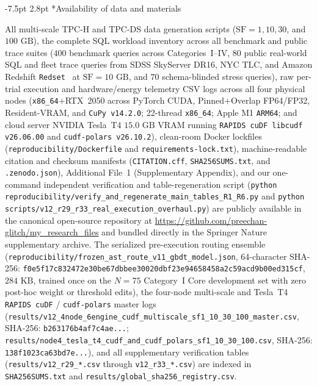 \documentclass[10pt,a4paper]{article}
\makeatletter
\renewcommand\subsection{\@startsection{subsection}{2}{\z@}%
  {-7.5pt \@plus -2pt \@minus -1pt}%
  {2.8pt \@plus 1pt}%
  {\normalfont\normalsize\bfseries}}
\makeatother
\begin{document}
\subsection*{Availability of data and materials}
{\scriptsize All multi-scale TPC-H and TPC-DS data generation scripts ($\text{SF}=1, 10, 30$, and $100\text{ GB}$), the complete SQL workload inventory across all benchmark and public trace suites ($400$ benchmark queries across Categories~I--IV, $80$ public real-world SQL and fleet trace queries from SDSS SkyServer DR16, NYC TLC, and Amazon Redshift \texttt{Redset}~\cite{vanrenen2024redset} at $\text{SF}=10\text{ GB}$, and $70$ schema-blinded stress queries), raw per-trial execution and hardware/energy telemetry CSV logs across all four physical nodes (\texttt{x86\_64}+RTX~2050 across PyTorch CUDA, Pinned+Overlap FP64/FP32, Resident-VRAM, and \texttt{CuPy v14.2.0}; 22-thread \texttt{x86\_64}; Apple M1 \texttt{ARM64}; and cloud server NVIDIA Tesla~T4 $15.0\text{ GB}$ VRAM running \texttt{RAPIDS cuDF libcudf v26.06.00} and \texttt{cudf-polars v26.10.2}), clean-room Docker lockfiles (\texttt{reproducibility/\allowbreak{}Dockerfile} and \texttt{requirements-\allowbreak{}lock.txt}), machine-readable citation and checksum manifests (\texttt{CITATION.cff}, \texttt{SHA256SUMS.txt}, and \texttt{.zenodo.json}), Additional File~1 (Supplementary Appendix), and our one-command independent verification and table-regeneration script (\texttt{python reproducibility/verify\_\allowbreak{}and\_\allowbreak{}regenerate\_\allowbreak{}main\_\allowbreak{}tables\_\allowbreak{}R1\_\allowbreak{}R6.py} and \texttt{python scripts/v12\_\allowbreak{}r29\_\allowbreak{}r33\_\allowbreak{}real\_\allowbreak{}execution\_\allowbreak{}overhaul.py}) are publicly available in the canonical open-source repository at \url{https://github.com/preechan-glitch/my_research_files} and bundled directly in the Springer Nature supplementary archive. The serialized pre-execution routing ensemble (\texttt{reproducibility/\allowbreak{}frozen\_\allowbreak{}ast\_\allowbreak{}route\_\allowbreak{}v11\_\allowbreak{}gbdt\_\allowbreak{}model.json}, 64-character SHA-256: \texttt{f0e5f17c832472e30be67dbbee30020dbf23e94658458a2c59acd9b00ed315cf}, $284\text{ KB}$, trained once on the $N=75$ Category~I Core development set with zero post-hoc weight or threshold edits), the four-node multi-scale and Tesla~T4 \texttt{RAPIDS cuDF} / \texttt{cudf-polars} master logs (\texttt{results/v12\_\allowbreak{}4node\_\allowbreak{}6engine\_\allowbreak{}cudf\_\allowbreak{}multiscale\_\allowbreak{}sf1\_\allowbreak{}10\_\allowbreak{}30\_\allowbreak{}100\_\allowbreak{}master.csv}, SHA-256: \texttt{b263176b4af7c4ae...}; \texttt{results/node4\_\allowbreak{}tesla\_\allowbreak{}t4\_\allowbreak{}cudf\_\allowbreak{}and\_\allowbreak{}cudf\_\allowbreak{}polars\_\allowbreak{}sf1\_\allowbreak{}10\_\allowbreak{}30\_\allowbreak{}100.csv}, SHA-256: \texttt{138f1023ca63bd7e...}), and all supplementary verification tables (\texttt{results/v12\_\allowbreak{}r29\_*.csv} through \texttt{v12\_\allowbreak{}r33\_*.csv}) are indexed in \texttt{SHA256SUMS.txt} and \texttt{results/\allowbreak{}global\_\allowbreak{}sha256\_\allowbreak{}registry.csv}.\par}
\vspace{-5pt}
\end{document}
